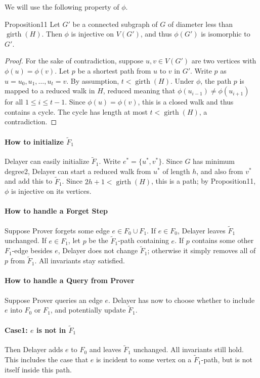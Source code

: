 We will use the following property of $\phi$.
\begin{authorclaim}{Proposition11}
Let $G'$ be a connected subgraph of $G$ of diameter less than $\operatorname{girth}(H)$. Then $\phi$ is injective on $V(G')$, and thus $\phi(G')$ is isomorphic to $G'$.
\end{authorclaim}
\begin{proof}
For the sake of contradiction, suppose $u,v\in V(G')$ are two vertices with $\phi(u)=\phi(v)$. Let $p$ be a shortest path from $u$ to $v$ in $G'$. Write $p$ as $u=u_0,u_1,\ldots,u_t=v$. By assumption, $t<\operatorname{girth}(H)$. Under $\phi$, the path $p$ is mapped to a reduced walk in $H$, reduced meaning that $\phi(u_{i-1})\ne\phi(u_{i+1})$ for all $1\le i\le t-1$. Since $\phi(u)=\phi(v)$, this is a closed walk and thus contains a cycle. The cycle has length at most $t<\operatorname{girth}(H)$, a contradiction.
\end{proof}
\paragraph{How to initialize $\widetilde F_1$}
Delayer can easily initialize $\widetilde F_1$. Write $e^*=\{u^*,v^*\}$. Since $G$ has minimum degree2, Delayer can start a reduced walk from $u^*$ of length $h$, and also from $v^*$ and add this to $\widetilde F_1$. Since $2h+1<\operatorname{girth}(H)$, this is a path; by Proposition11, $\phi$ is injective on its vertices.
\paragraph{How to handle a Forget Step}
Suppose Prover forgets some edge $e\in F_0\cup F_1$. If $e\in F_0$, Delayer leaves $\widetilde F_1$ unchanged. If $e\in F_1$, let $p$ be the $\widetilde F_1$-path containing $e$. If $p$ contains some other $F_1$-edge besides $e$, Delayer does not change $\widetilde F_1$; otherwise it simply removes all of $p$ from $\widetilde F_1$. All invariants stay satisfied.
\paragraph{How to handle a Query from Prover}
Suppose Prover queries an edge $e$. Delayer has now to choose whether to include $e$ into $F_0$ or $F_1$, and potentially update $\widetilde F_1$.
\paragraph{Case1: $e$ is not in $\widetilde F_1$}
Then Delayer adds $e$ to $F_0$ and leaves $\widetilde F_1$ unchanged. All invariants still hold. This includes the case that $e$ is incident to some vertex on a $\widetilde F_1$-path, but is not itself inside this path.

